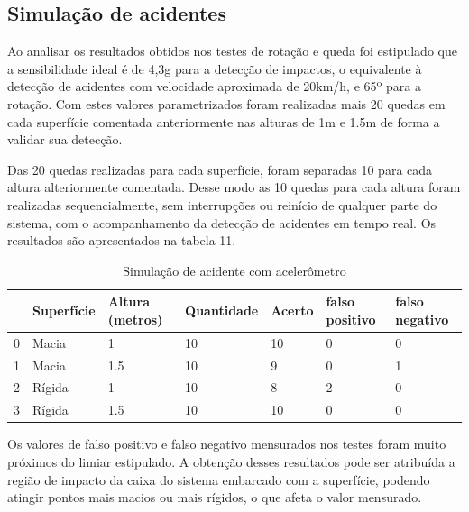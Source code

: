 \subsection{\textbf{Simulação de acidentes}}

Ao analisar os resultados obtidos nos testes de rotação e queda foi estipulado que a sensibilidade ideal é de 4,3g para a detecção de impactos, o equivalente à detecção de acidentes com velocidade aproximada de 20km/h, e 65º para a rotação. Com estes valores parametrizados foram realizadas mais 20 quedas em cada superfície comentada anteriormente nas alturas de 1m e 1.5m de forma a validar sua detecção.

Das 20 quedas realizadas para cada superfície, foram separadas 10 para cada altura alteriormente comentada. Desse modo as 10 quedas para cada altura foram realizadas sequencialmente, sem interrupções ou reinício de qualquer parte do sistema, com o acompanhamento da detecção de acidentes em tempo real. Os resultados são apresentados na tabela 11.



\begin{table}[H]
\caption{Simulação de acidente com acelerômetro}
\begin{adjustbox}{width=\columnwidth,center}
\begin{tabular}{lllllll}
\toprule
{} &        Superfície     &    Altura (metros)  &       Quantidade & Acerto & falso positivo & falso negativo \\
\midrule
0 &              Macia     &    1         &    10  &  10   &  0 &  0  \\
1 &              Macia     &    1.5       &    10  &  9   &  0 &  1  \\
2 &              Rígida    &    1         &    10  &  8   &  2 &  0  \\
3 &              Rígida    &    1.5       &    10  &  10  &  0 &  0  \\

\bottomrule
\end{tabular}

\end{adjustbox}
\end{table}


Os valores de falso positivo e falso negativo mensurados nos testes foram muito próximos do limiar estipulado. A obtenção desses resultados pode ser atribuída a região de impacto da caixa do sistema embarcado com a superfície, podendo atingir pontos mais macios ou mais rígidos, o que afeta o valor mensurado.

